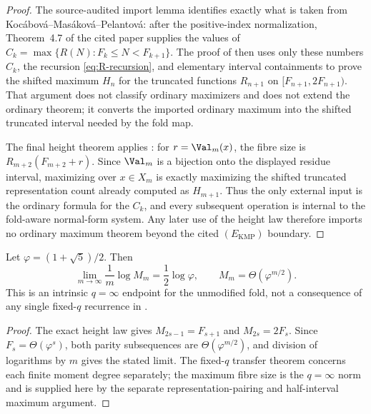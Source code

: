\begin{proof}
The source-audited import lemma identifies exactly what is taken from
Koc\'abov\'a--Mas\'akov\'a--Pelantov\'a: after the positive-index normalization,
Theorem~4.7 of the cited paper supplies the values of
\(C_k=\max\{R(N):F_k\le N<F_{k+1}\}\).  The proof of
 then uses only these
numbers \(C_k\), the recursion \eqref{eq:R-recursion}, and elementary interval
containments to prove the shifted maximum \(H_n\) for the truncated functions
\(R_{n+1}\) on \([F_{n+1},2F_{n+1})\).  That argument does not classify ordinary
maximizers and does not extend the ordinary theorem; it converts the imported
ordinary maximum into the shifted truncated interval needed by the fold map.

The final height theorem applies :
for \(r=\Val_m(x)\), the fibre size is
\(R_{m+2}(F_{m+2}+r)\).  Since \(\Val_m\) is a bijection onto the displayed
residue interval, maximizing over \(x\in X_m\) is exactly maximizing the shifted
truncated representation count already computed as \(H_{m+1}\).  Thus the only
external input is the ordinary formula for the \(C_k\), and every subsequent
operation is internal to the fold-aware normal-form system.  Any later use of the
height law therefore imports no ordinary maximum theorem beyond the cited
\((E_{\mathrm{KMP}})\) boundary.
\end{proof}


\begin{corollary}
\label{cor:linfty-fold-entropy}
Let \(\varphi=(1+\sqrt5)/2\).  Then
\[
  \lim_{m\to\infty}\frac1m\log M_m=\frac12\log\varphi,
  \qquad
  M_m=\Theta(\varphi^{m/2}).
\]
This is an intrinsic \(q=\infty\) endpoint for the unmodified fold, not a
consequence of any single fixed-\(q\) recurrence in
.
\end{corollary}

\begin{proof}
The exact height law gives \(M_{2s-1}=F_{s+1}\) and \(M_{2s}=2F_s\).  Since
\(F_s=\Theta(\varphi^s)\), both parity subsequences are
\(\Theta(\varphi^{m/2})\), and division of logarithms by \(m\) gives the stated
limit.  The fixed-\(q\) transfer theorem concerns each finite moment degree
separately; the maximum fibre size is the \(q=\infty\) norm and is supplied here
by the separate representation-pairing and half-interval maximum argument.
\end{proof}

